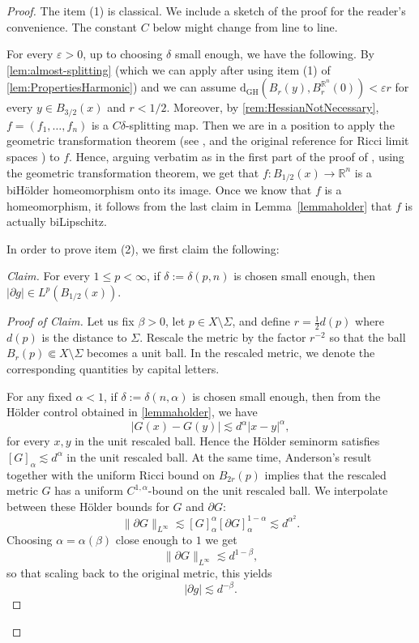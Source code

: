 \documentclass[12pt,a4paper,reqno]{amsart}
\renewcommand{\leq}{\leqslant}
\begin{document}
\begin{proof}
    The item (1) is classical. We include a sketch of the proof for the reader's convenience. The constant $C$ below might change from line to line.
    
    For every $\varepsilon>0$, up to choosing $\delta$ small enough, we have the following. By \cref{lem:almost-splitting} (which we can apply after using item (1) of \cref{lem:PropertiesHarmonic}) and \cite[Theorem 4.3]{ChJiNa} we can assume $\mathrm{d}_{\mathrm{GH}}(B_r(y), B_r^{\mathbb R^n}(0))<\varepsilon r$ for every $y\in B_{3/2}(x)$ and $r<1/2$. Moreover, by \cref{rem:HessianNotNecessary}, $f=(f_1,\ldots,f_n)$ is a $C\delta$-splitting map. Then we are in a position to apply the geometric transformation theorem (see \cite[Proposition 3.13 \& Corollary 3.16]{BNSInv}, and the original reference for Ricci limit spaces \cite[Theorem 7.2]{ChJiNa}) to $f$. Hence, arguing verbatim as in the first part of the proof of \cite[Theorem 7.10]{ChJiNa}, using the geometric transformation theorem, we get that $f:B_{1/2}(x)\to\mathbb R^n$ is a biH\"older homeomorphism onto its image. Once we know that $f$ is a homeomorphism, it follows from the last claim in Lemma~\ref{lemmaholder} that $f$ is actually biLipschitz.
    \smallskip

    In order to prove item (2), we first claim the following: 
    
    \smallskip
    \noindent\emph{Claim.} For every $1\leq p<\infty$, if $\delta:=\delta(p,n)$ is chosen small enough, then $|\partial g|\in L^p(B_{1/2}(x))$. 

    \begin{proof}[Proof of Claim]
    Let us fix $\beta>0$, let $p\in X\setminus \Sigma$, and define $r = \frac{1}{2}d(p)$ where $d(p)$ is the distance to $\Sigma$.  Rescale the metric by the factor $r^{-2}$ so that the ball $B_r(p)\Subset X\setminus\Sigma$ becomes a unit ball. In the rescaled metric, we denote the corresponding quantities by capital letters. 
    
    For any fixed $\alpha<1$, if $\delta:=\delta(n,\alpha)$ is chosen small enough, then from the Hölder control obtained in \cref{lemmaholder}, we have
\[
|G(x)-G(y)| \lesssim d^\alpha |x-y|^\alpha,
\]
for every $x,y$ in the unit rescaled ball. Hence the Hölder seminorm satisfies $[G]_\alpha \lesssim d^\alpha$ in the unit rescaled ball. At the same time, Anderson's result~\cite{Anderson90} together with the uniform Ricci bound on $B_{2r}(p)$ implies that the rescaled metric $G$ has a uniform $C^{1,\alpha}$-bound on the unit rescaled ball. We interpolate between these H\"older bounds for $G$ and $\partial G$: 
\[
\|\partial G\|_{L^\infty}
\lesssim
[G]_\alpha^{\alpha}[\partial G]_\alpha^{1-\alpha} \lesssim d^{\alpha^2}.
\]
Choosing $\alpha=\alpha(\beta)$ close enough to $1$ we get
\[
\|\partial G\|_{L^\infty}
\lesssim
d^{1-\beta},
\]
so that scaling back to the original metric, this yields
\begin{equation}\label{eqn:ToUseAcross}
|\partial g| \lesssim d^{-\beta}.
\end{equation}



\end{proof}
\end{proof}
\end{document}
